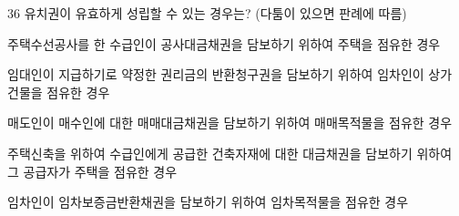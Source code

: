 \begin{question}{36}
유치권이 유효하게 성립할 수 있는 경우는? (다툼이 있으면 판례에 따름)
\begin{choices}
  \item 주택수선공사를 한 수급인이 공사대금채권을 담보하기 위하여 주택을 점유한 경우
  \item 임대인이 지급하기로 약정한 권리금의 반환청구권을 담보하기 위하여 임차인이 상가 건물을 점유한 경우
  \item 매도인이 매수인에 대한 매매대금채권을 담보하기 위하여 매매목적물을 점유한 경우
  \item 주택신축을 위하여 수급인에게 공급한 건축자재에 대한 대금채권을 담보하기 위하여 그 공급자가 주택을 점유한 경우
  \item 임차인이 임차보증금반환채권을 담보하기 위하여 임차목적물을 점유한 경우
\end{choices}
\end{question}
